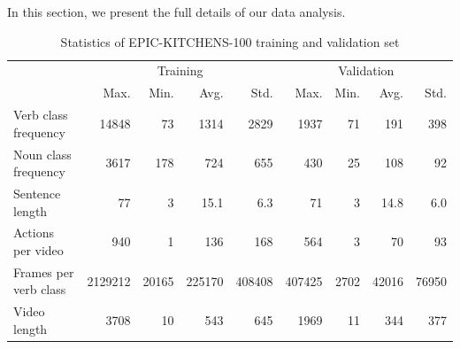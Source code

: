 \begin{minipage}{1\textwidth}
    In this section, we present the full details of our data analysis.
\end{minipage}
\begin{table}[ht!]
\begin{minipage}{1\textwidth}
\begin{center}
{\small
\begin{tabular}{lrrrrrrrr}
\toprule
& \multicolumn{4}{c}{Training} & \multicolumn{4}{c}{Validation}\\
~ & Max. & Min. & Avg. & Std. & Max. & Min. & Avg. & Std. \\
\midrule
Verb class frequency & 14848 & 73 & 1314 & 2829 & 1937 & 71 & 191 & 398\\
Noun class frequency & 3617 & 178 & 724 & 655 & 430 & 25 & 108 & 92\\
Sentence length & 77 & 3 & 15.1 & 6.3 & 71 & 3 & 14.8 & 6.0\\
Actions per video & 940 & 1 & 136 & 168 & 564 & 3 & 70 & 93\\
Frames per verb class & 2129212 & 20165 & 225170 & 408408 & 407425 & 2702 & 42016 & 76950 \\
Video length & 3708 & 10 & 543 & 645 & 1969 & 11 & 344 & 377 \\
\bottomrule
\end{tabular}}
\caption{Statistics of EPIC-KITCHENS-100 training and validation set}
\label{table:train_val_stats}
\end{center}
\end{minipage}
\end{table}

